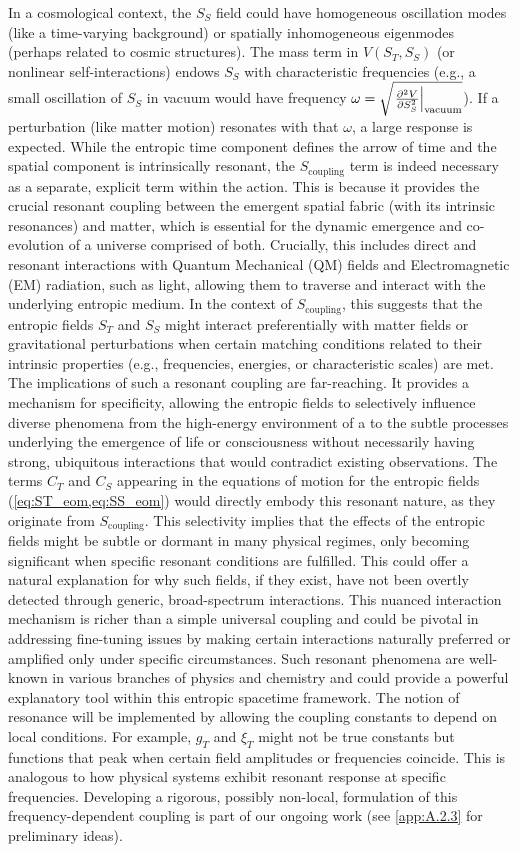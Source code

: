 \documentclass[11pt,a4paper]{article} %
\newcommand{\ST}{S_T}
\newcommand{\SSp}{S_S} %
\newcommand{\Scoupling}{S_{\text{coupling}}}
\newcommand{\QGP}{\text{quark-gluon plasma}} %
\begin{document}
In a cosmological context, the $\SSp$ field could have homogeneous oscillation modes (like a time-varying background) or spatially inhomogeneous eigenmodes (perhaps related to cosmic structures). The mass term in $V(\ST,\SSp)$ (or nonlinear self-interactions) endows $\SSp$ with characteristic frequencies (e.g., a small oscillation of $\SSp$ in vacuum would have frequency $\omega=\sqrt{\left.\pdv[2]{V}{\SSp}\right\vert_{\text{vacuum}}}$). If a perturbation (like matter motion) resonates with that $\omega$, a large response is expected. While the entropic time component defines the arrow of time and the spatial component is intrinsically resonant, the $\Scoupling$ term is indeed necessary as a separate, explicit term within the action. This is because it provides the crucial resonant coupling between the emergent spatial fabric (with its intrinsic resonances) and matter, which is essential for the dynamic emergence and co-evolution of a universe comprised of both. Crucially, this includes direct and resonant interactions with Quantum Mechanical (QM) fields and Electromagnetic (EM) radiation, such as light, allowing them to traverse and interact with the underlying entropic medium. In the context of $\Scoupling$, this suggests that the entropic fields $\ST$ and $\SSp$ might interact preferentially with matter fields or gravitational perturbations when certain matching conditions related to their intrinsic properties (e.g., frequencies, energies, or characteristic scales) are met. The implications of such a resonant coupling are far-reaching. It provides a mechanism for specificity, allowing the entropic fields to selectively influence diverse phenomena from the high-energy environment of a \QGP{} to the subtle processes underlying the emergence of life or consciousness without necessarily having strong, ubiquitous interactions that would contradict existing observations. The terms $C_T$ and $C_S$ appearing in the equations of motion for the entropic fields (\cref{eq:ST_eom,eq:SS_eom}) would directly embody this resonant nature, as they originate from $\Scoupling$. This selectivity implies that the effects of the entropic fields might be subtle or dormant in many physical regimes, only becoming significant when specific resonant conditions are fulfilled. This could offer a natural explanation for why such fields, if they exist, have not been overtly detected through generic, broad-spectrum interactions. This nuanced interaction mechanism is richer than a simple universal coupling and could be pivotal in addressing fine-tuning issues by making certain interactions naturally preferred or amplified only under specific circumstances. Such resonant phenomena are well-known in various branches of physics and chemistry and could provide a powerful explanatory tool within this entropic spacetime framework. The notion of resonance will be implemented by allowing the coupling constants to depend on local conditions. For example, $g_T$ and $\xi_T$ might not be true constants but functions that peak when certain field amplitudes or frequencies coincide. This is analogous to how physical systems exhibit resonant response at specific frequencies. Developing a rigorous, possibly non-local, formulation of this frequency-dependent coupling is part of our ongoing work (see \cref{app:A.2.3} for preliminary ideas).
\end{document}
